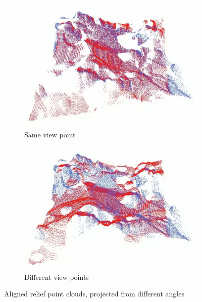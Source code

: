 \begin{figure}[h]
\centering
\begin{subfigure}{.5\textwidth}
	\includegraphics[width=\linewidth]{fig/relief_dproj_1.png}
	\caption{Same view point}
\end{subfigure}%
\begin{subfigure}{.5\textwidth}
	\includegraphics[width=\linewidth]{fig/relief_dproj_2.png}
	\caption{Different view points}
\end{subfigure}
\caption{Aligned relief point clouds, projected from different angles}
\label{fig:relief_dproj}
\end{figure}


